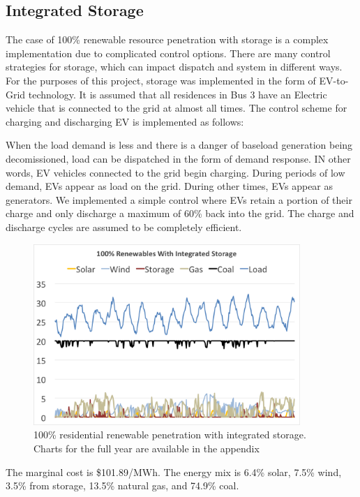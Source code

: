 \documentclass[a4paper]{article}
\begin{document}
\subsection{Integrated Storage}

The case of 100\% renewable resource penetration with storage is a complex implementation due to complicated control options. There are many control strategies for storage, which can impact dispatch and system in different ways. For the purposes of this project, storage was implemented in the form of EV-to-Grid technology. It is assumed that all residences in Bus 3 have an Electric vehicle that is connected to the grid at almost all times. The control scheme for charging and discharging EV is implemented as follows:

When the load demand is less and there is a danger of baseload generation being decomissioned, load can be dispatched in the form of demand response. IN other words, EV vehicles connected to the grid begin charging. During periods of low demand, EVs appear as load on the grid. During other times, EVs appear as generators. We implemented a simple control where EVs retain a portion of their charge and only discharge a maximum of 60\% back into the grid. The charge and discharge cycles are assumed to be completely efficient.

\begin{figure}
\centering
\includegraphics[width=0.9\textwidth , height=0.25\textheight]{Storage.png}
\caption{\label{fig:FIG7}100\% residential renewable penetration with integrated storage. Charts for the full year are available in the appendix}
\end{figure}

The marginal cost is \$101.89/MWh. The energy mix is 6.4\% solar, 7.5\% wind, 3.5\% from storage, 13.5\% natural gas, and 74.9\% coal.  
\end{document}
